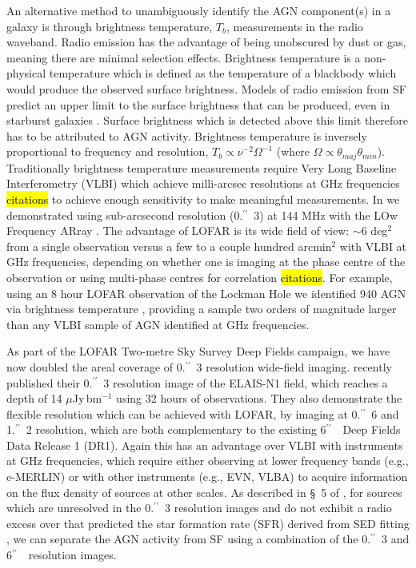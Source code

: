 \documentclass[usenatbib,fleqn,letters]{mnras}
\newcommand{\sarc}{$^{\prime\prime}\!\!$}
\begin{document}
An alternative method to unambiguously identify the AGN component(s) in a galaxy is through brightness temperature, $T_b$, measurements in the radio waveband. Radio emission has the advantage of being unobscured by dust or gas, meaning there are minimal selection effects. Brightness temperature is a non-physical temperature which is defined as the temperature of a blackbody which would produce the observed surface brightness. Models of radio emission from SF predict an upper limit to the surface brightness that can be produced, even in starburst galaxies \citep{condon_radio_1992}. Surface brightness which is detected above this limit therefore has to be attributed to AGN activity. Brightness temperature is inversely proportional to frequency and resolution, $T_b \propto \nu^{-2}\Omega^{-1}$ (where $\Omega \propto \theta_{maj}\theta_{min}$). Traditionally brightness temperature measurements require Very Long Baseline Interferometry (VLBI) which achieve milli-arcsec resolutions at GHz frequencies \hl{citations} to achieve enough sensitivity to make meaningful measurements. In \cite[][heareafter, \hl{M22}]{morabito_identifying_2022} we demonstrated using sub-arcsecond resolution (0.\sarc\ 3) at 144 MHz with the LOw Frequency ARray \citep[LOFAR;][]{van_haarlem_lofar:_2013}. The advantage of LOFAR is its wide field of view: $\sim$6 deg$^2$ from a single observation versus a few to a couple hundred arcmin$^2$ with VLBI at GHz frequencies, depending on whether one is imaging at the phase centre of the observation or using multi-phase centres for correlation \hl{citations}. For example, using an 8 hour LOFAR observation of the Lockman Hole \citep{sweijen_deep_2022} we identified 940 AGN via brightness temperature \cite{morabito_identifying_2022}, providing a sample two orders of magnitude larger than any VLBI sample of AGN identified at GHz frequencies. 

As part of the LOFAR Two-metre Sky Survey Deep Fields \citep{sabater_lofar_2021,tasse_lofar_2021} campaign, we have now doubled the areal coverage of 0.\sarc\ 3 resolution wide-field imaging. \cite{de_jong_into_2024} recently published their 0.\sarc\ 3 resolution image of the ELAIS-N1 field, which reaches a depth of 14 $\mu$Jy$\,$bm$^{-1}$ using 32 hours of observations. They also demonstrate the flexible resolution which can be achieved with LOFAR, by imaging at 0.\sarc\ 6 and 1.\sarc\ 2 resolution, which are both complementary to the existing 6\sarc\ \ Deep Fields Data Release 1 (DR1). Again this has an advantage over VLBI with instruments at GHz frequencies, which require either observing at lower frequency bands (e.g., e-MERLIN) or with other instruments (e.g., EVN, VLBA) to acquire information on the flux density of sources at other scales. As described in \S~5 of \citep{morabito_identifying_2022}, for sources which are unresolved in the 0.\sarc\ 3 resolution images and do not exhibit a radio excess over that predicted the star formation rate (SFR) derived from SED fitting \citep[see][for more details]{best_lofar_2023}, we can separate the AGN activity from SF using a combination of the 0.\sarc\ 3 and 6\sarc\ \ resolution images. 
\end{document}
